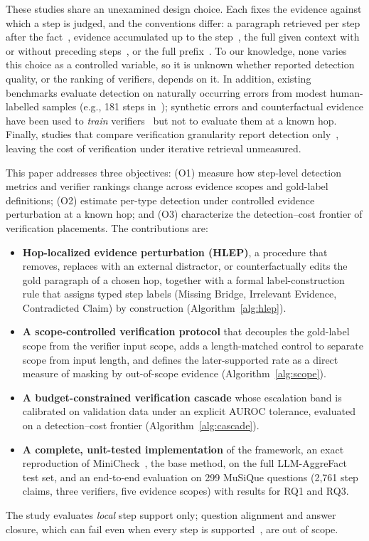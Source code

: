 \documentclass[conference]{IEEEtran}
\begin{document}
These studies share an unexamined design choice. Each fixes the evidence against which a step is judged, and the conventions differ: a paragraph retrieved per step after the fact~\cite{jacovi2024reveal}, evidence accumulated up to the step~\cite{ji2026stepgap}, the full given context with or without preceding steps~\cite{chu2026locally,kwon2026safe,pham2026grace}, or the full prefix~\cite{kim2026prostep}. To our knowledge, none varies this choice as a controlled variable, so it is unknown whether reported detection quality, or the ranking of verifiers, depends on it. In addition, existing benchmarks evaluate detection on naturally occurring errors from modest human-labelled samples (e.g., 181 steps in~\cite{ji2026stepgap}); synthetic errors and counterfactual evidence have been used to \emph{train} verifiers~\cite{kwon2026safe,chu2026locally} but not to evaluate them at a known hop. Finally, studies that compare verification granularity report detection only~\cite{jacovi2024reveal,pham2026grace}, leaving the cost of verification under iterative retrieval unmeasured.

This paper addresses three objectives: (O1) measure how step-level detection metrics and verifier rankings change across evidence scopes and gold-label definitions; (O2) estimate per-type detection under controlled evidence perturbation at a known hop; and (O3) characterize the detection--cost frontier of verification placements. The contributions are:
\begin{itemize}
\item \textbf{Hop-localized evidence perturbation (HLEP)}, a procedure that removes, replaces with an external distractor, or counterfactually edits the gold paragraph of a chosen hop, together with a formal label-construction rule that assigns typed step labels (Missing Bridge, Irrelevant Evidence, Contradicted Claim) by construction (Algorithm~\ref{alg:hlep}).
\item \textbf{A scope-controlled verification protocol} that decouples the gold-label scope from the verifier input scope, adds a length-matched control to separate scope from input length, and defines the later-supported rate as a direct measure of masking by out-of-scope evidence (Algorithm~\ref{alg:scope}).
\item \textbf{A budget-constrained verification cascade} whose escalation band is calibrated on validation data under an explicit AUROC tolerance, evaluated on a detection--cost frontier (Algorithm~\ref{alg:cascade}).
\item \textbf{A complete, unit-tested implementation} of the framework, an exact reproduction of MiniCheck~\cite{tang2024minicheck}, the base method, on the full LLM-AggreFact test set, and an end-to-end evaluation on 299 MuSiQue questions (2,761 step claims, three verifiers, five evidence scopes) with results for RQ1 and RQ3.
\end{itemize}
The study evaluates \emph{local} step support only; question alignment and answer closure, which can fail even when every step is supported~\cite{chu2026locally}, are out of scope.
\end{document}
